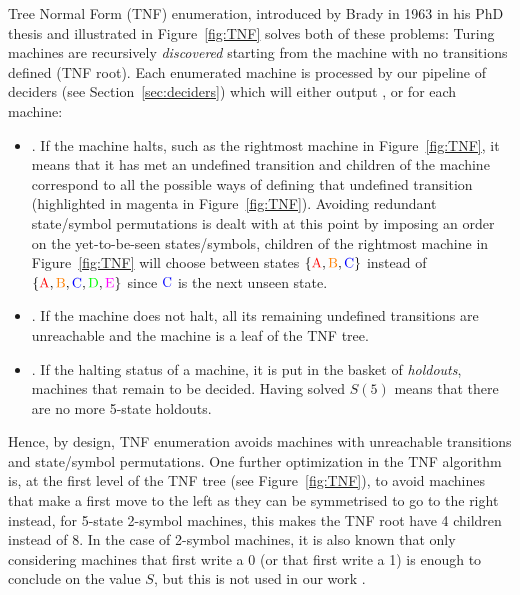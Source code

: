 Tree Normal Form (TNF) enumeration, introduced by Brady in 1963 in his PhD thesis \cite{Brady64} and illustrated in Figure~\ref{fig:TNF} solves both of these problems: Turing machines are recursively \textit{discovered} starting from the machine with no transitions defined (TNF root). Each enumerated machine is processed by our pipeline of deciders (see Section~\ref{sec:deciders}) which will either output \HALT, \NONHALT or \UNKNOWN for each machine:
\begin{itemize}
    \item \HALT. If the machine halts, such as the rightmost machine in Figure~\ref{fig:TNF}, it means that it has met an undefined transition and children of the machine correspond to all the possible ways of defining that undefined transition (highlighted in magenta in Figure~\ref{fig:TNF}). Avoiding redundant state/symbol permutations is dealt with at this point by imposing an order on the yet-to-be-seen states/symbols, \eg children of the rightmost machine in Figure~\ref{fig:TNF} will choose between states $\{\text{\stateA},\text{\stateB},\text{\stateC}\}$ instead of $\{\text{\stateA},\text{\stateB},\text{\stateC},\text{\stateD},\text{\stateE}\}$ since $\text{\stateC}$ is the next unseen state.
    \item \NONHALT. If the machine does not halt, all its remaining undefined transitions are unreachable and the machine is a leaf of the TNF tree.
    \item \UNKNOWN. If the halting status of a machine, it is put in the basket of \textit{holdouts}, \ie machines that remain to be decided. Having solved $S(5)$ means that there are no more 5-state holdouts.
\end{itemize}

Hence, by design, TNF enumeration avoids machines with unreachable transitions and state/symbol permutations. One further optimization in the TNF algorithm is,
at the first level of the TNF tree (see Figure~\ref{fig:TNF}), to avoid machines that make a first move to the left as they can be symmetrised to go to the right instead, \eg for 5-state 2-symbol machines, this makes the TNF root have 4 children instead of 8. In the case of 2-symbol machines, it is also known that only considering machines that first write a 0 (or that first write a 1) is enough to conclude on the value $S$, but this is not used in our work \cite{Marxen_1990,busycoq}.

